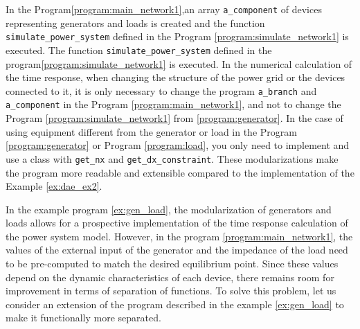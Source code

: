 \documentclass[graybox, envcountchap]{svmult}
\begin{document}
\begin{example}
In the Program\nobreak\ref{program:main_network1},an array \verb|a_component| of devices representing generators and loads is created and the function \verb|simulate_power_system| defined in the Program \nobreak\ref{program:simulate_network1} is executed.
The function \verb|simulate_power_system| defined in the program\nobreak\ref{program:simulate_network1} is executed.
In the numerical calculation of the time response, when changing the structure of the power grid or the devices connected to it,
it is only necessary to change the program \verb|a_branch| and \verb|a_component| in the Program \ref{program:main_network1},
and not to change the Program \nobreak\ref{program:simulate_network1} from \nobreak\ref{program:generator}.
In the case of using equipment different from the generator or load in the Program \nobreak\ref{program:generator} or Program \ref{program:load},
you only need to implement and use a class with \verb|get_nx| and \verb|get_dx_constraint|.
These modularizations make the program more readable and extensible compared to the implementation of the Example \ref{ex:dae_ex2}.
\end{example}

In the example program \ref{ex:gen_load}, the modularization of generators and loads allows for a prospective implementation of the time response calculation of the power system model.
However, in the program \nobreak\ref{program:main_network1}, the values of the external input of the generator and the impedance of the load need to be pre-computed to match the desired equilibrium point.
Since these values depend on the dynamic characteristics of each device, there remains room for improvement in terms of separation of functions.
To solve this problem, let us consider an extension of the program described in the example \ref{ex:gen_load} to make it functionally more separated.
\end{document}
